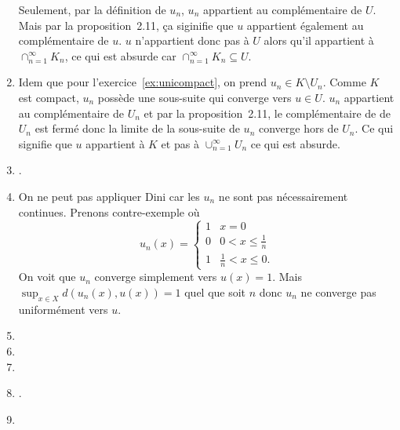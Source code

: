 \begin{enumerate}
    Seulement, par la définition de $u_n$, $u_n$ appartient au complémentaire de $U$.
    Mais par la proposition~2.11, ça siginifie que $u$ appartient également au complémentaire de $u$.
    $u$ n'appartient donc pas à $U$ alors qu'il appartient à $\cap_{n=1}^\infty K_n$,
    ce qui est absurde car $\cap_{n=1}^\infty K_n \subseteq U$.
  \item Idem que pour l'exercice~\ref{ex:unicompact},
    on prend $u_n \in K \setminus U_n$.
    Comme $K$ est compact, $u_n$ possède une sous-suite qui converge vers $u \in U$.
    $u_n$ appartient au complémentaire de $U_n$ et
    par la proposition~2.11, le complémentaire de de $U_n$ est fermé donc la limite
    de la sous-suite de $u_n$ converge hors de $U_n$.
    Ce qui signifie que $u$ appartient à $K$ et pas à $\cup_{n=1}^\infty U_n$ ce
    qui est absurde.
  \item {}.   %
  \item On ne peut pas appliquer Dini car les $u_n$ ne sont pas nécessairement continues.
    Prenons contre-exemple où
    \[ u_n(x) =
      \begin{cases}
        1 & x = 0\\
        0 & 0 < x \leq \frac{1}{n}\\
        1 & \frac{1}{n} < x \leq 0.
      \end{cases}
    \]
    On voit que $u_n$ converge simplement vers $u(x) = 1$.
    Mais $\sup_{x \in X} d(u_n(x), u(x)) = 1$ quel que soit $n$
    donc $u_n$ ne converge pas uniformément vers $u$.
  \item
    \nosolution
  \item
    \nosolution
  \item
    \nosolution
  \item {}.   %
  \item
    \nosolution
\end{enumerate}

